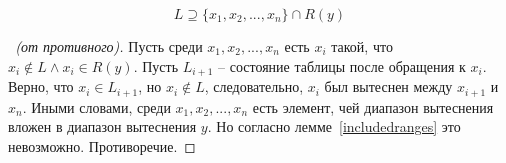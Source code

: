 \begin{lemma}
$$L \supseteq \{x_1, x_2, ..., x_n\} \cap R(y)$$
\end{lemma}
\begin{proof}[\proofname~(от противного)]
Пусть среди $x_1, x_2, ..., x_n$ есть $x_i$ такой, что $x_i \notin L
\wedge x_i \in R(y)$. Пусть $L_{i+1}$ -- состояние таблицы после обращения к $x_i$. Верно, что $x_i \in L_{i+1}$, но
$x_i \notin L$, следовательно, $x_i$ был вытеснен между $x_{i+1}$ и
$x_n$. Иными словами, среди $x_1, x_2, ..., x_n$ есть элемент, чей
диапазон вытеснения вложен в диапазон вытеснения $y$. Но согласно
лемме~\ref{includedranges} это невозможно. Противоречие.
\end{proof}

\theoremtext{\ref{LRU_equation}}{\DiapazonLRU}
